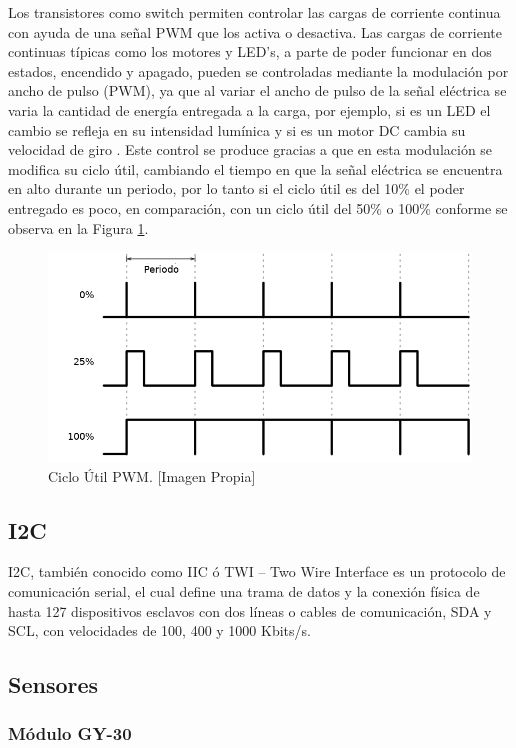 Los transistores como switch permiten controlar las cargas de corriente continua con ayuda de una señal PWM que los activa o desactiva. Las cargas de corriente continuas típicas como los motores y LED's, a parte de poder funcionar en dos estados, encendido y apagado, pueden se controladas mediante la modulación por ancho de pulso (PWM), ya que al variar el ancho de pulso de la señal eléctrica se varia la cantidad de energía entregada a la carga, por ejemplo, si es un LED el cambio se refleja en su intensidad lumínica y si es un motor DC cambia su velocidad de giro \cite{PWM}. Este control se produce gracias a que en esta modulación se modifica su ciclo útil, cambiando el tiempo en que la señal eléctrica se encuentra en alto durante un periodo, por lo tanto si el ciclo útil es del 10\% el poder entregado es poco, en comparación, con un ciclo útil del 50\% o 100\% conforme se observa en la Figura \ref{fig:pwm-duty-800x396}.

\begin{figure}[H]
	\centering
	\caption[Ciclo Útil PWM.]{Ciclo Útil PWM. [Imagen Propia] }
	\label{fig:pwm-duty-800x396}
	\includegraphics[width=0.5\linewidth]{Imagenes/pwm}
\end{figure}


\subsection{I2C}

I2C, también conocido como IIC ó TWI – Two Wire Interface es un protocolo de comunicación serial, el cual define una trama de datos y la conexión física de hasta 127 dispositivos esclavos con dos líneas o cables de comunicación, SDA y SCL, con velocidades de 100, 400 y 1000 Kbits/s. \cite{I2C} \\

\subsection{Sensores}\label{sec:sensors}

\subsubsection{Módulo GY-30}

